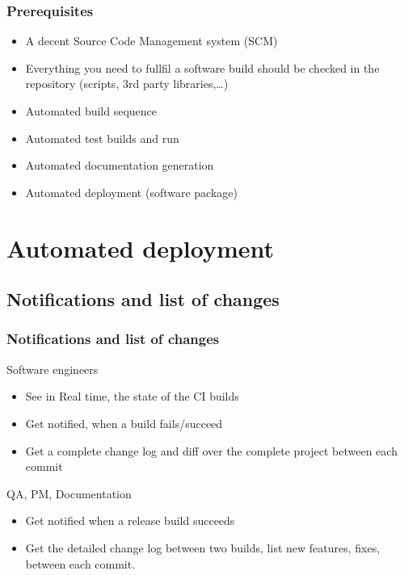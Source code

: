 \documentclass{beamer}
\begin{document}
\begin{frame}
\frametitle{Prerequisites}

\begin{itemize}
  \item<1-> A decent Source Code Management system (SCM)\cite{Berczuk03}
  \item<2-> Everything you need to fullfil a software build should be checked in
  the repository\cite{Berczuk03} (scripts, 3rd party libraries,\ldots)
  \item<3-> Automated build sequence
  \item<4-> Automated test builds and run
  \item<5-> Automated documentation generation
  \item<6-> Automated deployment (software package)  
\end{itemize}

\end{frame}

\section[Automated deployment]{Automated deployment}
\subsection[Notifications and list of changes]{Notifications and list of
changes}
\begin{frame}
\frametitle{Notifications and list of changes}
{
\begin{block}{Software engineers}
   \begin{itemize}
     \item<1-> See in Real time, the state of the CI builds
     \item<2-> Get notified, when a build fails/succeed
     \item<3-> Get a complete change log and diff over the complete
     project between each commit
   \end{itemize}
 \end{block}
}
{
\begin{block}{QA, PM, Documentation}
   \begin{itemize}
     \item<4-> Get notified when a release build succeeds
     \item<5-> Get the detailed change log between two builds, list new
     features, fixes, between each commit.
   \end{itemize}
 \end{block}
}

\end{frame}
\end{document}
